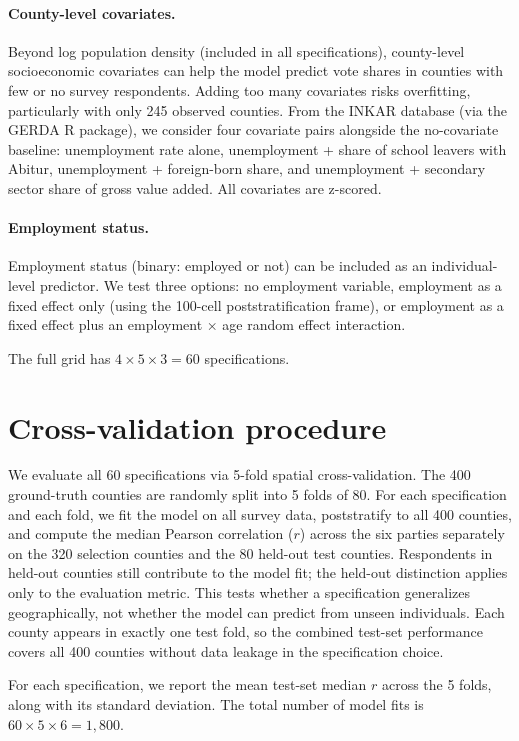 \documentclass[11pt]{article}
\begin{document}
\paragraph{County-level covariates.} Beyond log population density (included in all specifications), county-level socioeconomic covariates can help the model predict vote shares in counties with few or no survey respondents. Adding too many covariates risks overfitting, particularly with only 245 observed counties. From the INKAR database (via the GERDA R package), we consider four covariate pairs alongside the no-covariate baseline: unemployment rate alone, unemployment + share of school leavers with Abitur, unemployment + foreign-born share, and unemployment + secondary sector share of gross value added. All covariates are z-scored.

\paragraph{Employment status.} Employment status (binary: employed or not) can be included as an individual-level predictor. We test three options: no employment variable, employment as a fixed effect only (using the 100-cell poststratification frame), or employment as a fixed effect plus an employment $\times$ age random effect interaction.

The full grid has $4 \times 5 \times 3 = 60$ specifications.

\section{Cross-validation procedure}

We evaluate all 60 specifications via 5-fold spatial cross-validation. The 400 ground-truth counties are randomly split into 5 folds of 80. For each specification and each fold, we fit the model on all survey data, poststratify to all 400 counties, and compute the median Pearson correlation ($r$) across the six parties separately on the 320 selection counties and the 80 held-out test counties. Respondents in held-out counties still contribute to the model fit; the held-out distinction applies only to the evaluation metric. This tests whether a specification generalizes geographically, not whether the model can predict from unseen individuals. Each county appears in exactly one test fold, so the combined test-set performance covers all 400 counties without data leakage in the specification choice.

For each specification, we report the mean test-set median $r$ across the 5 folds, along with its standard deviation. The total number of model fits is $60 \times 5 \times 6 = 1{,}800$.
\end{document}
